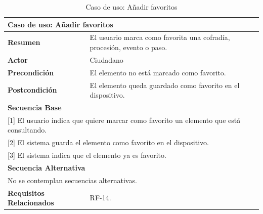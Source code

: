 \begin{table}[h!]
    \centering
    \renewcommand{\arraystretch}{1.5}

    \begin{tabular}{|p{4cm}|p{11cm}|}
        \hline
        \multicolumn{2}{|l|}{\textbf{Caso de uso: Añadir favoritos}} \\
        \hline
        \textbf{Resumen} & El usuario marca como favorita una cofradía, procesión, evento o paso. \\
        \hline
        \textbf{Actor} & Ciudadano \\
        \hline
        \textbf{Precondición} & El elemento no está marcado como favorito. \\
        \hline
        \textbf{Postcondición} & El elemento queda guardado como favorito en el dispositivo. \\
        \hline
        \multicolumn{2}{|l|}{\textbf{Secuencia Base}} \\
        \hline
        \multicolumn{2}{|p{15cm}|}{ [1] El usuario indica que quiere marcar como favorito un elemento que está consultando. } \\
        \hline
        \multicolumn{2}{|p{15cm}|}{ [2] El sistema guarda el elemento como favorito en el dispositivo. } \\
        \hline
        \multicolumn{2}{|p{15cm}|}{ [3] El sistema indica que el elemento ya es favorito. } \\
        \hline
        \multicolumn{2}{|l|}{\textbf{Secuencia Alternativa}} \\
        \hline
        \multicolumn{2}{|p{15cm}|}{ No se contemplan secuencias alternativas. } \\
        \hline
        \textbf{Requisitos Relacionados} & RF-14. \\
        \hline
    \end{tabular}
    \caption{Caso de uso: Añadir favoritos}
\end{table}

